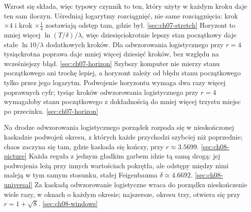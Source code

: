 %
  {Wzrost się składa, więc typowy czynnik to ten, który użyty w każdym kroku daje ten sam iloczyn. Uśredniaj logarytmy rozciągnięć, nie same rozciągnięcia: krok $\times 4$ i krok $\times \tfrac14$ zostawiają odstęp tam, gdzie był.}%
  {\ref{sec:ch07-stretch}}
%
  {Horyzont to mniej więcej $\ln(T/\delta)/\lambda$, więc dziesięciokrotnie lepszy stan początkowy daje stałe $\ln 10/\lambda$ dodatkowych kroków. Dla odwzorowania logistycznego przy $r = 4$ tysiąckrotna poprawa daje mniej więcej dziesięć kroków, bez względu na wcześniejszy błąd.}%
  {\ref{sec:ch07-horizon}}
%
  {Szybszy komputer nie mierzy stanu początkowego ani trochę lepiej, a horyzont zależy od błędu stanu początkowego tylko przez jego logarytm. Podwojenie horyzontu wymaga dwa razy więcej poprawnych cyfr; tysiąc kroków odwzorowania logistycznego przy $r = 4$ wymagałoby stanu początkowego z dokładnością do mniej więcej trzystu miejsc po przecinku.}%
  {\ref{sec:ch07-horizon}}

%
  {Na drodze odwzorowania logistycznego porządek rozpada się w nieskończonej kaskadzie podwojeń okresu, z których każde przychodzi szybciej niż poprzednie; chaos zaczyna się tam, gdzie kaskada się kończy, przy $r \approx \num{3.5699}$.}%
  {\ref{sec:ch08-picture}}
%
  {Każda reguła z jednym gładkim garbem idzie tą samą drogą: jej podwojenia leżą przy innych wartościach pokrętła, ale odstępy między nimi maleją w tym samym stosunku, stałej Feigenbauma $\delta \approx \num{4.6692}$.}%
  {\ref{sec:ch08-universal}}
%
  {Za kaskadą odwzorowanie logistyczne wraca do porządku nieskończenie wiele razy, w oknach o każdym okresie; najszersze, okresu trzy, otwiera się przy $r = 1 + \sqrt{8}$.}%
  {\ref{sec:ch08-windows}}

